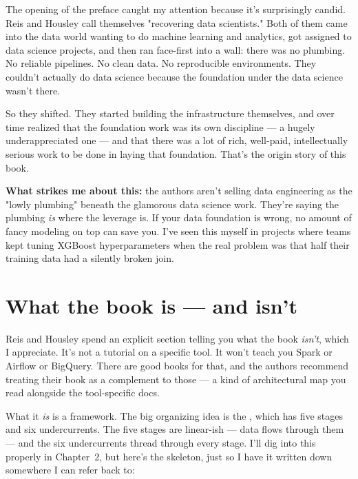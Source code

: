 The opening of the preface caught my attention because it's surprisingly candid. Reis and Housley call themselves "recovering data scientists." Both of them came into the data world wanting to do machine learning and analytics, got assigned to data science projects, and then ran face-first into a wall: there was no plumbing. No reliable pipelines. No clean data. No reproducible environments. They couldn't actually do data science because the foundation under the data science wasn't there.

So they shifted. They started building the infrastructure themselves, and over time realized that the foundation work was its own discipline — a hugely underappreciated one — and that there was a lot of rich, well-paid, intellectually serious work to be done in laying that foundation. That's the origin story of this book.

\begin{quotebox}
\textbf{What strikes me about this:} the authors aren't selling data engineering as the "lowly plumbing" beneath the glamorous data science work. They're saying the plumbing \emph{is} where the leverage is. If your data foundation is wrong, no amount of fancy modeling on top can save you. I've seen this myself in projects where teams kept tuning XGBoost hyperparameters when the real problem was that half their training data had a silently broken join.
\end{quotebox}

\section*{What the book is — and isn't}

Reis and Housley spend an explicit section telling you what the book \emph{isn't}, which I appreciate. It's not a tutorial on a specific tool. It won't teach you Spark or Airflow or BigQuery. There are good books for that, and the authors recommend treating their book as a complement to those — a kind of architectural map you read alongside the tool-specific docs.

What it \emph{is} is a framework. The big organizing idea is the , which has five stages and six undercurrents. The five stages are linear-ish — data flows through them — and the six undercurrents thread through every stage. I'll dig into this properly in Chapter~2, but here's the skeleton, just so I have it written down somewhere I can refer back to:

